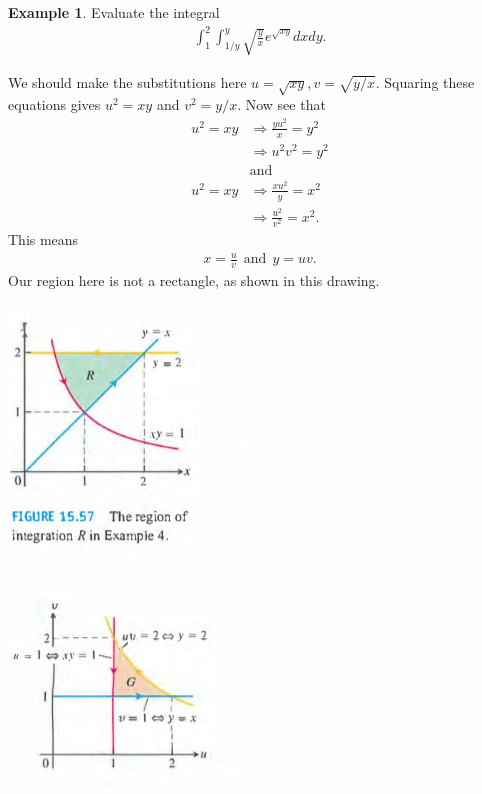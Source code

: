 \documentclass[12pt, letter]{article}
\theoremstyle{plain}
\numberwithin{theorem}{section}
\theoremstyle{definition}
\newtheorem{example}[theorem]{Example}
\begin{document}
\begin{example}
Evaluate the integral
\begin{align*}
\int_1^2 \int_{1/y}^y \sqrt{\frac{y}{x}} e^{\sqrt{xy}} dxdy.
\end{align*}

\bigskip

We should make the substitutions here $u=\sqrt{xy}, v= \sqrt{y/x}$. Squaring these equations gives $u^2=xy$ and $v^2=y/x$. Now see that
\begin{align*}
u^2=xy &\Rightarrow \frac{yu^2}{x} = y^2\\
&\Rightarrow u^2v^2=y^2\\
&\text{and}\\
u^2=xy &\Rightarrow \frac{xu^2}{y} = x^2\\
&\Rightarrow \frac{u^2}{v^2} = x^2.
\end{align*}
This means
\begin{align*}
x=\frac{u}{v} \ \ \text{and} \ \ y=uv.
\end{align*}
Our region here is not a rectangle, as shown in this drawing.

\bigskip

\begin{center}
\includegraphics[scale=0.7]{m3_f26}
\end{center}

\bigskip


\end{example}
\end{document}
